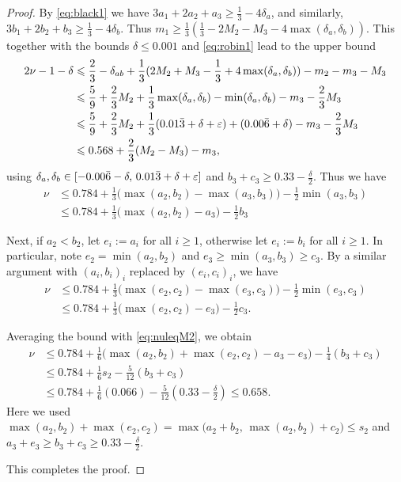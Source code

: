 \begin{proof}
By \eqref{eq:black1} we have $3a_1 + 2a_2 + a_3 \ge \frac{1}{3}-4\delta_a$, and similarly,
$3b_1 + 2b_2 +b_3 \ge \frac{1}{3}-4\delta_b$. Thus $m_1 \ge \frac{1}{3}(\frac{1}{3}-2M_2 - M_3-4\max(\delta_a,\delta_b))$.
This together with the bounds $\delta\leq 0.001$ and \eqref{eq:robin1} lead to the upper bound
\begin{align*}
2\nu-1 -\delta
& \leqslant \frac{2}{3}
-\delta_{ab}
+ \frac{1}{3}(2M_2 + M_3-\frac{1}{3}+4\max(\delta_a,\delta_b)) - m_2 - m_3 - M_3 \\
& \leqslant \frac{5}{9} +  \frac{2}{3}M_2
+\frac{1}{3}\max(\delta_a,\delta_b)- \min(\delta_a,\delta_b)
- m_3 - \frac{2}{3}M_3  \\
&\leqslant \frac{5}{9} +  \frac{2}{3}M_2+
\frac{1}{3}(0.01\bar{3}+\delta+\varepsilon) + (0.00\bar{6}+\delta)
- m_3 - \frac{2}{3}M_3\\
&\leqslant 0.568+\frac{2}{3}(M_2-M_3)- m_3,
\end{align*}
using $\delta_a,\delta_b\in [-0.00\bar{6}-\delta,\, 0.01\bar{3}+\delta+\varepsilon]$ and $b_3 + c_3 \ge 0.33 - \frac{\delta}{2}$. Thus we have
\begin{align}\label{eq:nuleqM2}
\nu & \le 0.784 + \frac{1}{3}\big(\max(a_2,b_2)-\max(a_3,b_3)\big) - \frac{1}{2}\min(a_3,b_3) \nonumber\\
&\le 0.784 + \frac{1}{3}\big(\max(a_2,b_2)-a_3\big) - \frac{1}{2}b_3
\end{align}


Next, if $a_2<b_2$, let $e_i := a_i$ for all $i\ge1$, otherwise let $e_i := b_i$ for all $i\ge1$. In particular, note $e_2 = \min(a_2,b_2)$ and $e_3 \ge \min(a_3,b_3)\ge c_3$. By a similar argument with $(a_i,b_i)_i$ replaced by $(e_i,c_i)_i$, we have
\begin{align*}
\nu &\le 0.784 + \frac{1}{3}\big(\max(e_2,c_2)-\max(e_3,c_3)\big) - \frac{1}{2}\min(e_3,c_3)\\
&\le 0.784 + \frac{1}{3}\big(\max(e_2,c_2)-e_3\big) - \frac{1}{2}c_3.
\end{align*}

Averaging the bound with \eqref{eq:nuleqM2}, we obtain
\begin{align}
\nu &\le 0.784 + \frac{1}{6}\big(\max(a_2,b_2)+\max(e_2,c_2)-a_3-e_3\big) - \frac{1}{4}(b_3+c_3) \nonumber\\
&\le 0.784 + \frac{1}{6}s_2 - \frac{5}{12}(b_3+c_3) \nonumber\\
&\le 0.784 + \frac{1}{6}(0.066) - \frac{5}{12}(0.33 - \tfrac{\delta}{2})
 \le 0.658.
\end{align}
Here we used $\max(a_2,b_2)+\max(e_2,c_2) = \max\big(a_2+b_2, \, \max(a_2,b_2) + c_2\big) \le s_2$ and $a_3+e_3 \ge b_3+c_3 \ge 0.33 - \frac{\delta}{2}$.

This completes the proof.

\end{proof}

